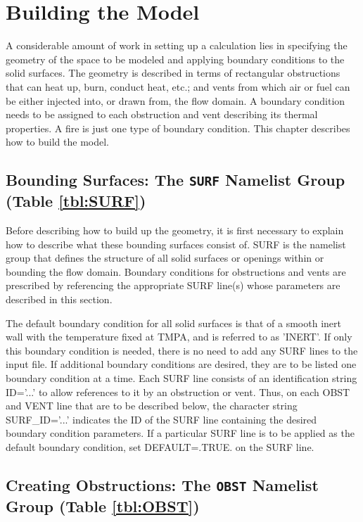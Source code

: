 \documentclass[11pt]{book}
\begin{document}
\chapter{Building the Model}

A considerable amount of work in setting up a calculation lies in specifying the
geometry of the space to be modeled and applying boundary conditions
to the solid surfaces. The geometry is described in terms
of rectangular obstructions that can heat up, burn, conduct heat, etc.;
and vents from which air or fuel can be
either injected into, or drawn from, the flow domain.
A boundary condition needs to be assigned to each obstruction
and vent describing its thermal properties. A fire is just one type of
boundary condition. This chapter describes how to build the model.


\section{Bounding Surfaces: The \texorpdfstring{{\tt SURF}}{SURF} Namelist Group (Table \ref{tbl:SURF})}
\label{info:SURF}

Before describing how to build up the geometry, it is first necessary to explain how to describe what these bounding surfaces
consist of. {\ct SURF} is the namelist group that defines
the structure of all solid surfaces or openings within or
bounding the flow domain. Boundary conditions for obstructions and vents are
prescribed by referencing the appropriate {\ct SURF} line(s) whose
parameters are described in this section.

The default boundary condition for all solid surfaces is that of a smooth
inert wall with the temperature fixed at {\ct TMPA}, and is referred to as {\ct 'INERT'}. If only this
boundary condition is needed, there is no need to add any {\ct SURF} lines
to the input file. If additional boundary conditions are desired,
they are to be listed one boundary condition at a time.
Each {\ct SURF} line consists of an identification string {\ct ID='...'} to
allow references to it by an obstruction or vent. Thus, on each
{\ct OBST} and {\ct VENT} line that are to be described below, the character string {\ct SURF\_ID='...'}
indicates the {\ct ID} of the {\ct SURF} line containing the desired boundary
condition parameters. If a particular {\ct SURF} line is to be applied
as the default boundary condition,
set {\ct DEFAULT=.TRUE.} on the {\ct SURF} line.




\section{Creating Obstructions: The \texorpdfstring{{\tt OBST}}{OBST} Namelist Group (Table \ref{tbl:OBST})}
\label{info:OBST}
\end{document}
